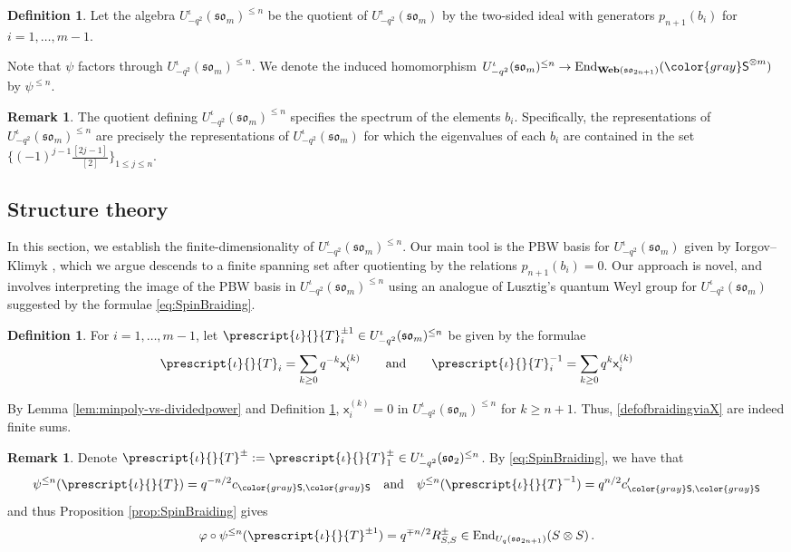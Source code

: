 \documentclass[10pt]{amsart}
\newcommand{\gray}[1]{{\color{gray}#1}}
\numberwithin{equation}{section}
\theoremstyle{definition}
\newtheorem{rem}[thm]{Remark}
\newtheorem{defn}[thm]{Definition}
\newcommand{\End}{{\rm End}}
\newcommand{\son}[1][2n+1]{\mathfrak{so}_{#1}}
\newcommand{\som}[1][m]{\mathfrak{so}_{#1}}
\newcommand{\Web}{\mathbf{Web}}
\newcommand{\iqUsom}[1][m]{{U}^{\iota}_{-q^2}(\som[#1])}
\newcommand{\iQW}{\prescript{\iota}{}{T}}
\newcommand{\xxb}{\mathsf{x}}
\newcommand{\gS}{\gray{\mathsf{S}}}
\begin{document}
\begin{defn}\label{def:iQn}
Let the algebra $\iqUsom^{\le n}$ be the quotient of $\iqUsom$ 
by the two-sided ideal with generators $p_{n+1}(b_i)$ for $i=1, \ldots, m-1$. 
\end{defn}

Note that $\psi$ factors through $\iqUsom^{\le n}$. 
We denote the induced homomorphism 
$\iqUsom^{\le n}\rightarrow \End_{\Web(\son)}(\gS^{\otimes m})$
by $\psi^{\le n}$.

\begin{rem}\label{rem:bi-spectrum} 
The quotient defining $\iqUsom^{\le n}$ specifies the spectrum of the elements $b_i$.
Specifically, the representations of $\iqUsom^{\le n}$ are precisely 
the representations of $\iqUsom$ for which the eigenvalues of each $b_i$ 
are contained in the set $\{(-1)^{j-1} \frac{[2j-1]}{[2]}\}_{1 \le j \le n}$. 
\end{rem}

\subsection{Structure theory}

In this section, we establish the finite-dimensionality of $\iqUsom^{\le n}$. 
Our main tool is the PBW basis for $\iqUsom$ given by Iorgov--Klimyk \cite{MR1903121},
which we argue descends to a finite spanning set after quotienting by the relations $p_{n+1}(b_i)=0$.
Our approach is novel, and involves interpreting the image of the PBW basis in $\iqUsom^{\le n}$ 
using an analogue of Lusztig's quantum Weyl group for $\iqUsom$ suggested by the 
formulae \eqref{eq:SpinBraiding}. 

\begin{defn}
For $i=1, \ldots, m-1$, let
$\iQW_i^{\pm 1}\in \iqUsom^{\le n}$ be given by the formulae
\begin{equation} \label{defofbraidingviaX}
\iQW_i = \sum_{k\ge 0}q^{-k}\xxb_i^{(k)} 
\qquad \text{and} \qquad 
\iQW_i^{-1} = \sum_{k\ge 0}q^k\xxb_i^{(k)}
\end{equation}
\end{defn}

By Lemma \ref{lem:minpoly-vs-dividedpower} and Definition \ref{def:iQn}, 
$\xxb_i^{(k)} = 0$ in $\iqUsom^{\le n}$ for $k \geq n+1$. Thus, 
\eqref{defofbraidingviaX} are indeed finite sums.

\begin{rem}\label{rem:TisR}
Denote $\iQW^{\pm} := \iQW_1^{\pm} \in \iqUsom[2]^{\le n}$.
By \eqref{eq:SpinBraiding}, we have that
\[
\psi^{\leq n}(\iQW) = q^{-n/2} c_{\gS,\gS} 
\quad \text{and} \quad
\psi^{\leq n}(\iQW^{-1}) = q^{n/2} c_{\gS,\gS}'
\]
and thus Proposition \ref{prop:SpinBraiding} gives
\[
\varphi \circ \psi^{\leq n}(\iQW^{\pm 1}) = q^{\mp n/2} R_{S,S}^{\pm} \in \End_{U_q(\son)}(S \otimes S) \, .
\]
\end{rem}
\end{document}
